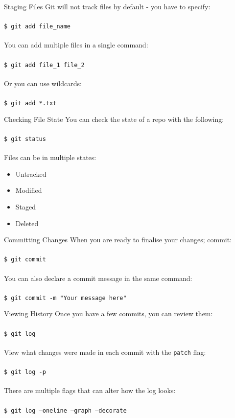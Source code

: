 \documentclass{beamer}
\begin{document}
\begin{frame}{Staging Files}
    Git will not track files by default - you have to specify: \\~\\
    {\tt \$ git add file\_name} \\~\\
    You can add multiple files in a single command: \\~\\
    {\tt \$ git add file\_1 file\_2} \\~\\
    Or you can use wildcards: \\~\\
    {\tt \$ git add *.txt}
\end{frame}

\begin{frame}{Checking File State}
    You can check the state of a repo with the following: \\~\\
    {\tt \$ git status} \\~\\
    Files can be in multiple states:
    \begin{itemize}
        \item Untracked
        \item Modified
        \item Staged
        \item Deleted
    \end{itemize}
\end{frame}

\begin{frame}{Committing Changes}
    When you are ready to finalise your changes; commit: \\~\\
    {\tt \$ git commit} \\~\\
    You can also declare a commit message in the same command: \\~\\
    {\tt \$ git commit -m "Your message here"}
\end{frame}

\begin{frame}{Viewing History}
    Once you have a few commits, you can review them:\\~\\
    {\tt \$ git log} \\~\\
    View what changes were made in each commit with the {\tt patch} flag: \\~\\
    {\tt \$ git log -p} \\~\\
    There are multiple flags that can alter how the log looks: \\~\\
    {\tt \$ git log --oneline --graph --decorate}
\end{frame}
\end{document}
